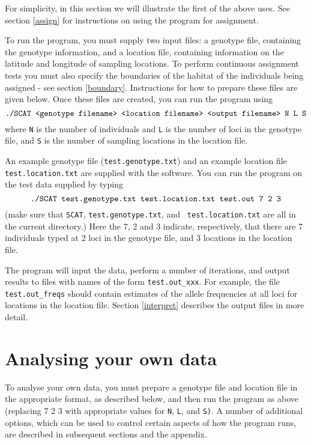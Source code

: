 \documentclass[11pt,titlepage,times,letterpaper]{article}
\begin{document}
For simplicity, in this section we will illustrate the first
of the above uses. See section \ref{assign} for
instructions on using the program for assignment.

To run the program, you must supply two input files: a genotype file,
containing the genotype information, and a location file, containing
information on the latitude and longitude of sampling locations. To
perform continuous assignment tests you must also specify the
boundaries of the habitat of the individuals being assigned - see
section \ref{boundary}.  Instructions for how to prepare these files
are given below. Once these files are created, you can run the program
using
$$\text{{\tt ./SCAT <genotype filename> <location filename> <output
filename> N L S}}$$ where {\tt N} is the number of
individuals and {\tt L} is the number of loci in the genotype file,
and {\tt S} is the number of sampling locations in the location file.

An example genotype file ({\tt test.genotype.txt})
and an example location file {\tt test.location.txt} are supplied with
the software.  You can run the program on the test data supplied by
typing
$$\text{{\tt ./SCAT test.genotype.txt test.location.txt test.out 7 2 3}}$$ 
(make sure that {\tt SCAT}, {\tt test.genotype.txt}, and {\tt
test.location.txt} are all in the current directory.)  Here the 7, 2
and 3 indicate, respectively, that there are 7 individuals typed at 2
loci in the genotype file, and 3 locations in the location file.

The program will input the data, perform a number of iterations, and
output results to files with names of the form {\tt test.out\_xxx}.
For example, the file {\tt test.out\_freqs} should contain estimates of the
allele frequencies at all loci for locations in the location file.
Section \ref{interpret} describes the output files in more detail.

\section{Analysing your own data}

To analyse your own data, you must prepare a genotype file and
location file in the appropriate format, as described below, and then
run the program as above (replacing 7 2 3 with appropriate values for
{\tt N}, {\tt L}, and {\tt S)}. A number of additional options, which
can be used to control certain aspects of how the program runs, are
described in subsequent sections and the appendix.
\end{document}
